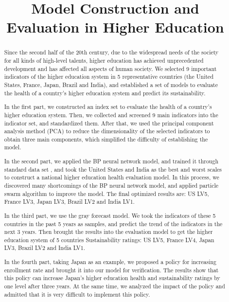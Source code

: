 \documentclass[12pt]{article}  %
\title{Model Construction and Evaluation in Higher Education}  %
\begin{document}
\begin{abstract}

Since the second half of the 20th century, due to the widespread needs of the society for all kinds of high-level talents, higher education has achieved unprecedented development and has affected all aspects of human society. We selected 9 important indicators of the higher education system in 5 representative countries (the United States, France, Japan, Brazil and India), and established a set of models to evaluate the health of a country’s higher education system and predict its sustainability.
\vspace{5mm}

In the first part, we constructed an index set to evaluate the health of a country's higher education system. Then, we collected and screened 9 main indicators into the indicator set, and standardized them. After that, we used the principal component analysis method (PCA) to reduce the dimensionality of the selected indicators to obtain three main components, which simplified the difficulty of establishing the model.
\vspace{5mm}

In the second part, we applied the BP neural network model, and trained it through standard data set , and took the United States and India as the best and worst scales to construct a national higher education health evaluation model. In this process, we discovered many shortcomings of the BP neural network model, and applied particle swarm algorithm to improve the model. The final optimized results are: US LV5, France LV3, Japan LV3, Brazil LV2 and India LV1.
\vspace{5mm}

In the third part, we use the gray forecast model. We took the indicators of these 5 countries in the past 5 years as samples, and predict the trend of the indicators in the next 3 years. Then brought the results into the evaluation model to get the higher education system of 5 countries Sustainability ratings: US LV5, France LV4, Japan LV3, Brazil LV2 and India LV1.
\vspace{5mm}

In the fourth part, taking Japan as an example, we proposed a policy for increasing enrollment rate and brought it into our model for verification. The results show that this policy can increase Japan's higher education health and sustainability ratings by one level after three years. At the same time, we analyzed the impact of the policy and admitted that it is very difficult to implement this policy.
\vspace{5mm}


\end{abstract}
\end{document}
